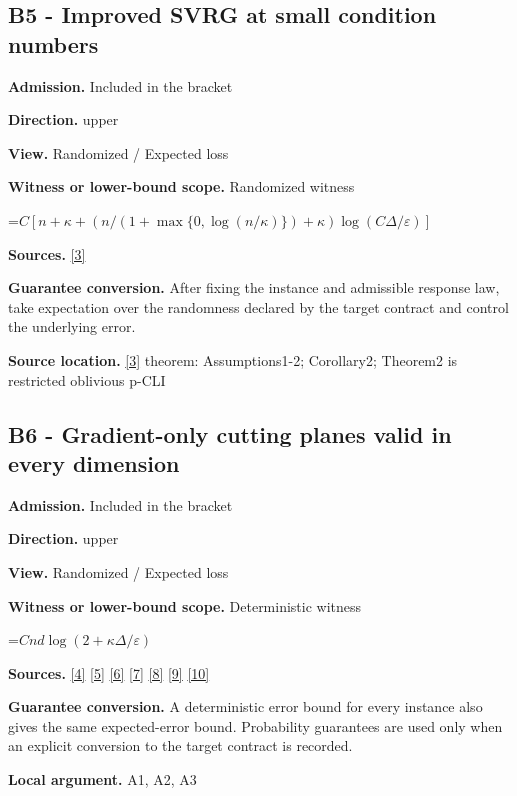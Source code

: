 \documentclass[10pt,a4paper]{article}
\newcommand{\AtlasMath}[1]{\par\begingroup\centering\setbox0=\hbox{$\displaystyle #1$}\ifdim\wd0>1.4\linewidth\typeout{ATLAS WIDE FORMULA: \the\wd0}\fi\ifdim\wd0>\linewidth\resizebox{\linewidth}{!}{\box0}\else\box0\fi\par\endgroup}
\begin{document}
\subsection{B5 - Improved SVRG at small condition numbers}
\textbf{Admission.} Included in the bracket

\textbf{Direction.} upper

\textbf{View.} Randomized / Expected loss

\textbf{Witness or lower-bound scope.} Randomized witness

\AtlasMath{C[n+\kappa+(n/(1+\max\{0,\log(n/\kappa)\})+\kappa)\log(C\Delta/\varepsilon)]}
\textbf{Sources.} \href{https://arxiv.org/pdf/1805.07786}{[3]}

\textbf{Guarantee conversion.} After fixing the instance and admissible response law, take expectation over the randomness declared by the target contract and control the underlying error.

\textbf{Source location.} \href{https://arxiv.org/pdf/1805.07786}{[3]} theorem: Assumptions1-2; Corollary2; Theorem2 is restricted oblivious p-CLI

\subsection{B6 - Gradient-only cutting planes valid in every dimension}
\textbf{Admission.} Included in the bracket

\textbf{Direction.} upper

\textbf{View.} Randomized / Expected loss

\textbf{Witness or lower-bound scope.} Deterministic witness

\AtlasMath{Cnd\log(2+\kappa\Delta/\varepsilon)}
\textbf{Sources.} \href{https://proceedings.mlr.press/v97/zhou19b/zhou19b.pdf}{[4]} \href{https://arxiv.org/pdf/1405.4980}{[5]} \href{https://arxiv.org/pdf/2101.09740v2}{[6]} \href{https://arxiv.org/pdf/2609.33360v2}{[7]} \href{https://arxiv.org/pdf/2609.10874}{[8]} \href{https://www2.isye.gatech.edu/~nemirovs/MOR_AccuracyCertificates.pdf}{[9]} \href{https://arxiv.org/pdf/2609.20701}{[10]}

\textbf{Guarantee conversion.} A deterministic error bound for every instance also gives the same expected-error bound. Probability guarantees are used only when an explicit conversion to the target contract is recorded.

\textbf{Local argument.} A1, A2, A3
\end{document}
